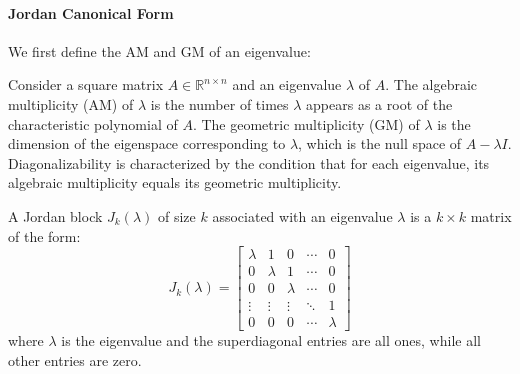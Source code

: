 \documentclass[11pt]{article}
\begin{document}
\paragraph{Jordan Canonical Form} We first define the AM and GM of an eigenvalue:
\begin{definition}
    Consider a square matrix \( A \in \mathbb{R}^{n \times n} \) and an eigenvalue \( \lambda \) of \( A \). The algebraic multiplicity (AM) of \( \lambda \) is the number of times \( \lambda \) appears as a root of the characteristic polynomial of \( A \). The geometric multiplicity (GM) of \( \lambda \) is the dimension of the eigenspace corresponding to \( \lambda \), which is the null space of \( A - \lambda I \). Diagonalizability is characterized by the condition that for each eigenvalue, its algebraic multiplicity equals its geometric multiplicity.
\end{definition}

\begin{definition}
    A Jordan block \( J_k(\lambda) \) of size \( k \) associated with an eigenvalue \( \lambda \) is a \( k \times k \) matrix of the form:
    \begin{equation}
    J_k(\lambda) = \begin{bmatrix}
    \lambda & 1 & 0 & \cdots & 0 \\
    0 & \lambda & 1 & \cdots & 0 \\
    0 & 0 & \lambda & \cdots & 0 \\
    \vdots & \vdots & \vdots & \ddots & 1 \\
    0 & 0 & 0 & \cdots & \lambda
    \end{bmatrix}
    \end{equation}
    where \( \lambda \) is the eigenvalue and the superdiagonal entries are all ones, while all other entries are zero.
    
\end{definition}
\end{document}
